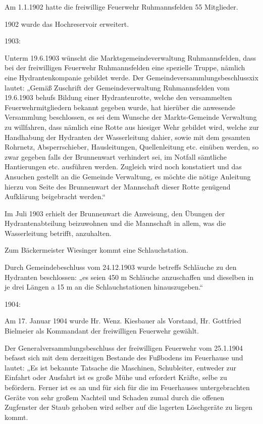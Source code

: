 \documentclass{book}
\begin{document}
Am 1.1.1902 hatte die freiwillige Feuerwehr Ruhmannsfelden 55 Mitglieder.

1902 wurde das Hochreservoir erweitert.

1903:

Unterm 19.6.1903 wünscht die Marktsgemeindeverwaltung Ruhmannsfelden, dass bei
der freiwilligen Feuerwehr Ruhmannsfelden eine spezielle Truppe, nämlich eine
Hydrantenkompanie gebildet werde. Der Gemeindeversammlungsbeschlussxix lautet:
„Gemäß Zuschrift der Gemeindeverwaltung Ruhmannsfelden vom 19.6.1903 behufs
Bildung einer Hydrantenrotte, welche den versammelten Feuerwehrmitgliedern
bekannt gegeben wurde, hat hierüber die anwesende Versammlung beschlossen, es
sei dem Wunsche der Markts-Gemeinde Verwaltung zu willfahren, dass nämlich eine
Rotte aus hiesiger Wehr gebildet wird, welche zur Handhabung der Hydranten der
Wasserleitung dahier, sowie mit dem gesamten Rohrnetz, Absperrschieber,
Hausleitungen, Quellenleitung etc. einüben werden, so zwar gegeben falls der
Brunnenwart verhindert sei, im Notfall sämtliche Hantierungen etc. ausführen
werden. Zugleich wird noch konstatiert und das Ansuchen gestellt an die Gemeinde
Verwaltung, es möchte die nötige Anleitung hierzu von Seite des Brunnenwart der
Mannschaft dieser Rotte genügend Aufklärung beigebracht werden.“

Im Juli 1903 erhielt der Brunnenwart die Anweisung, den Übungen der
Hydrantenabteilung beizuwohnen und die Mannschaft in allem, was die
Wasserleitung betrifft, anzuhalten.

Zum Bäckermeister Wiesinger kommt eine Schlauchstation.

Durch Gemeindebeschluss vom 24.12.1903 wurde betreffs Schläuche zu den Hydranten
beschlossen: „es seien 450 m Schläuche anzuschaffen und dieselben in je drei
Längen a 15 m an die Schlauchstationen hinauszugeben.“

1904:

Am 17. Januar 1904 wurde Hr. Wenz. Kiesbauer als Vorstand, Hr. Gottfried
Bielmeier als Kommandant der freiwilligen Feuerwehr gewählt.

Der Generalversammlungsbeschluss der freiwilligen Feuerwehr vom 25.1.1904
befasst sich mit dem derzeitigen Bestande des Fußbodens im Feuerhause und
lautet: „Es ist bekannte Tatsache die Maschinen, Schubleiter, entweder zur
Einfahrt oder Ausfahrt ist es große Mühe und erfordert Kräfte, selbe zu
befördern. Ferner ist es an und für sich für die im Feuerhauses untergebrachten
Geräte von sehr großem Nachteil und Schaden zumal durch die offenen Zugfenster
der Staub gehoben wird selber auf die lagerten Löschgeräte zu liegen kommt.
\end{document}
